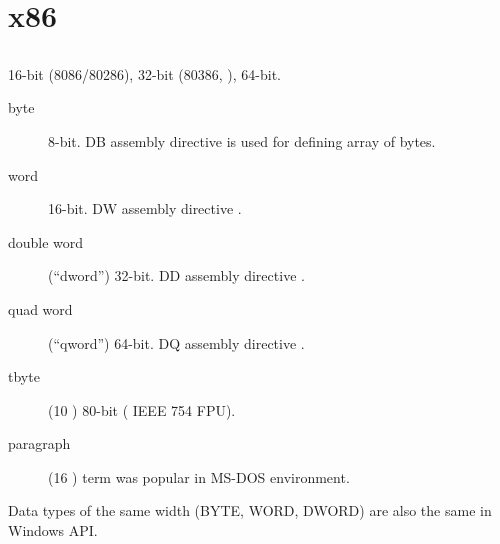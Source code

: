\chapter{x86}

\section{}

 16-bit (8086/80286), 32-bit (80386, ), 64-bit.

\begin{description}
	\item[byte] 8-bit. 
		{DB assembly directive is used for defining array of bytes}.
	\item[word] 16-bit. 
		{DW assembly directive \dittoclosing{}}.
	\item[double word] (``dword'') 32-bit. 
		{DD assembly directive \dittoclosing{}}.
	\item[quad word] (``qword'') 64-bit. 
		{DQ assembly directive \dittoclosing{}}.
	\item[tbyte] (10 ) 80-bit   
		( IEEE 754 FPU).
	\item[paragraph] (16 )\EMDASH{}
	{term was popular in MS-DOS environment}.
\end{description}

{Data types of the same width (BYTE, WORD, DWORD) are also the same in} Windows \ac{API}.

